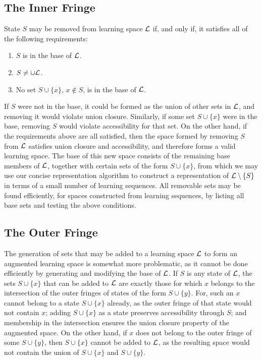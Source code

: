 \documentclass[11pt]{llncs}
\begin{document}
{\subsection{The Inner Fringe}

State $S$ may be removed from learning space $\cal L$ if, and only if, it satisfies all of the following requirements:
\begin{enumerate}
\item $S$ is in the base of $\cal L$.
\item $S\ne\cup\cal L$.
\item No set $S\cup\{x\}$, $x\notin S$, is in the base of $\cal L$.
\end{enumerate}
If $S$ were not in the base, it could be formed as the union of other sets in $\cal L$, and removing it would violate union closure. Similarly, if some set $S\cup\{x\}$ were in the base, removing $S$ would violate accessibility for that set. On the other hand, if the requirements above are all satisfied, then the space formed by removing $S$ from $\cal L$ satisfies union closure and accessibility, and therefore forms a valid learning space. The base of this new space consists of the remaining base members of $\cal L$, together with certain sets of the form $S\cup\{x\}$, from which we may use our concise representation algorithm to construct a representation of ${\cal L}\setminus\{S\}$ in terms of a small number of learning sequences.  All removable sets may be found efficiently, for spaces constructed from learning sequences, by listing all base sets and testing the above conditions.

\subsection{The Outer Fringe}

The generation of sets that may be added to a learning space $\cal L$ to form an augmented learning space is somewhat more problematic, as it cannot be done efficiently by generating and modifying the base of $\cal L$. If $S$ is any state of $\cal L$, the sets $S\cup\{x\}$ that can be added to $\cal L$ are exactly those for which $x$ belongs to the intersection of the outer fringes of states of the form $S\cup\{y\}$.
For, such an $x$ cannot belong to a state $S\cup\{x\}$ already, as the outer fringe of that state would not contain $x$; adding $S\cup\{x\}$ as a state preserves accessibility through $S$; and membership in the intersection ensures the union closure property of the augmented space. On the other hand, if $x$ does not belong to the outer fringe of some $S\cup\{y\}$, then $S\cup\{x\}$ cannot be added to $\cal L$, as the resulting space would not contain the union of $S\cup\{x\}$ and $S\cup\{y\}$.

}
\end{document}
